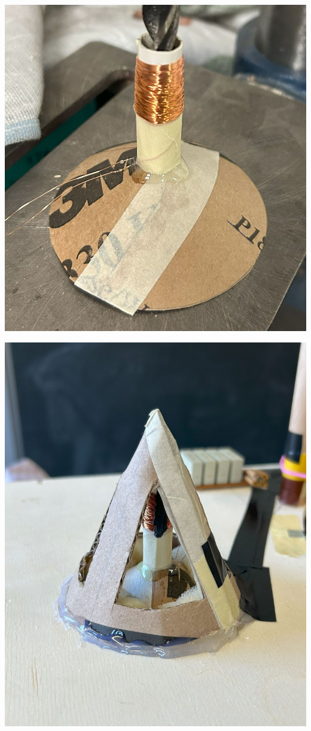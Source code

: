\documentclass[a4paper,11pt]{report}
\begin{document}
\begin{minipage}{0.5\textwidth}
    \centering
    \includegraphics[width=.8\linewidth]{resources/images/Fotos/Physik-84.jpg}
    \label{fig:fin_high}
\end{minipage}
\begin{minipage}{0.5\textwidth}
    \centering
    \includegraphics[width=.8\linewidth]{resources/images/Fotos/Physik-124.jpg}
    \label{fig:fin_high_unit}
\end{minipage}
\end{document}
